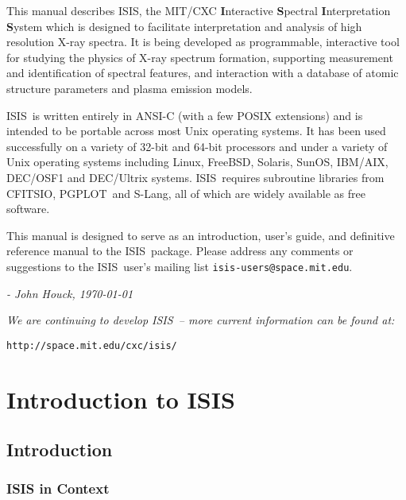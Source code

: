\documentclass{book}
\newcommand{\isisweb}{{\tt http://space.mit.edu/cxc/isis/}}
\newcommand{\isisx}{{\sc ISIS~}}
\newcommand{\isis}{{\sc ISIS}}
\newcommand{\cfitsio}{{\sc CFITSIO}}
\newcommand{\pgplot}{{\sc PGPLOT}}
\newcommand{\slang}{{\sc S-Lang}}
\begin{document}
This manual describes \isis, the MIT/CXC {\bf I}nteractive {\bf
S}pectral {\bf I}nterpretation {\bf S}ystem which is designed to
facilitate interpretation and analysis of high resolution X-ray
spectra.  It is being developed as programmable, interactive tool
for studying the physics of X-ray spectrum formation, supporting
measurement and identification of spectral features, and
interaction with a database of atomic structure parameters and
plasma emission models.

\isisx is written entirely in ANSI-C (with a few POSIX extensions)
and is intended to be portable across most Unix operating systems.
It has been used successfully on a variety of 32-bit and 64-bit
processors and under a variety of Unix operating systems including
Linux, FreeBSD, Solaris, SunOS, IBM/AIX, DEC/OSF1 and DEC/Ultrix systems.
\isisx requires subroutine libraries from \cfitsio, \pgplot\ and
\slang, all of which are widely available as free software.

This manual is designed to serve as an introduction, user's guide,
and definitive reference manual to the \isisx package. Please
address any comments or suggestions to the \isisx user's mailing
list {\tt isis-users@space.mit.edu}.


\vspace{20mm}

\hfill {\it- John Houck, \today} \hfill

\vspace{20mm}

{\it We are continuing to develop \isisx -- more current
information can be found at:}
\begin{center}
\isisweb
\end{center}

\newpage
\cleardoublepage
{}

\part{Introduction to ISIS \label{part:intro}}

\chapter{Introduction}
\label{chap:intro}

\section{ISIS in Context}
\end{document}
